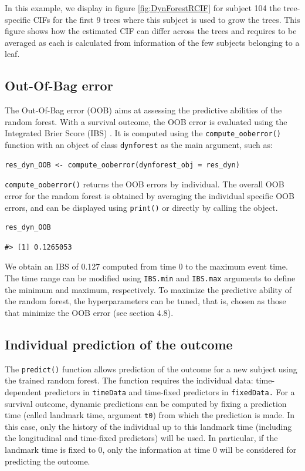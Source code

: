 In this example, we display in figure \ref{fig:DynForestRCIF} for subject 104 the tree-specific CIFs for the first 9 trees where this subject is used to grow the trees. This figure shows how the estimated CIF can differ across the trees and requires to be averaged as each is calculated from information of the few subjects belonging to a leaf.

\subsection{Out-Of-Bag error}\label{out-of-bag-error}

The Out-Of-Bag error (OOB) aims at assessing the predictive abilities of the random forest. With a survival outcome, the OOB error is evaluated using the Integrated Brier Score (IBS) \citep{gerds_consistent_2006}. It is computed using the \texttt{compute\_ooberror()} function with an object of class \texttt{dynforest} as the main argument, such as:

\begin{verbatim}
res_dyn_OOB <- compute_ooberror(dynforest_obj = res_dyn)
\end{verbatim}

\texttt{compute\_ooberror()} returns the OOB errors by individual. The overall OOB error for the random forest is obtained by averaging the individual specific OOB errors, and can be displayed using \texttt{print()} or directly by calling the object.

\begin{verbatim}
res_dyn_OOB
\end{verbatim}

\begin{verbatim}
#> [1] 0.1265053
\end{verbatim}

We obtain an IBS of 0.127 computed from time 0 to the maximum event time. The time range can be modified using \texttt{IBS.min} and \texttt{IBS.max} arguments to define the minimum and maximum, respectively. To maximize the predictive ability of the random forest, the hyperparameters can be tuned, that is, chosen as those that minimize the OOB error (see section 4.8).

\subsection{Individual prediction of the outcome}\label{individual-prediction-of-the-outcome-1}

The \texttt{predict()} function allows prediction of the outcome for a new subject using the trained random forest. The function requires the individual data: time-dependent predictors in \texttt{timeData} and time-fixed predictors in \texttt{fixedData.} For a survival outcome, dynamic predictions can be computed by fixing a prediction time (called landmark time, argument \texttt{t0}) from which the prediction is made. In this case, only the history of the individual up to this landmark time (including the longitudinal and time-fixed predictors) will be used. In particular, if the landmark time is fixed to 0, only the information at time 0 will be considered for predicting the outcome.

